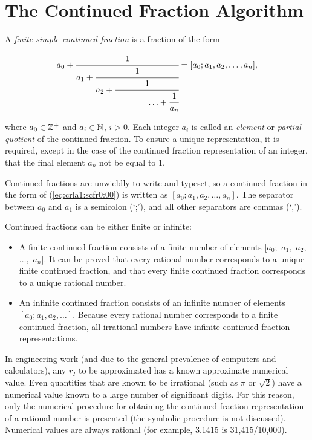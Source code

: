 \section{The Continued Fraction Algorithm}
\label{crla1:scfr0}

A \emph{finite simple continued fraction} is a fraction of the form

\begin{equation}
\label{eq:crla1:scfr0:00}
a_0 + \cfrac{1}{a_1 + \cfrac{1}{a_2
    + \cfrac{1}{\;\;\;\;\;\;\;\;\;\;\;\;\;\;\ldots + \cfrac{1}{a_n}}}}
    =
    [a_0; a_1, a_2, \ldots , a_n] ,
\end{equation}

\noindent{}where $a_0 \in {\mathbb{Z}^+}$ and $a_i \in
{\mathbb{N}}$, $i > 0$.  Each integer $a_i$ is called an
\emph{element} or \emph{partial quotient} of the continued
fraction.  To ensure a unique representation, it is required, except in
the case of the continued fraction representation of an integer, that the
final element $a_n$ not be equal to 1.

Continued fractions are unwieldly to write and typeset, so a continued
fraction in the form of (\ref{eq:crla1:scfr0:00}) is written as
$[a_0; a_1, a_2, \ldots , a_n]$.  The separator between $a_0$ and $a_1$ is
a semicolon (`;'), and all other separators are commas (`,').

Continued fractions can be either finite or infinite:

\begin{itemize}
\item A finite continued fraction consists of a finite number of elements
      $[a_0;$ $a_1,$ $a_2,$ $\ldots ,$ $a_n]$\@.  It can be proved that every rational
      number corresponds to a unique finite continued fraction, and that
      every finite continued fraction corresponds to a unique rational number.
\item An infinite continued fraction consists of an infinite number of
      elements $[a_0; a_1, a_2, \ldots]$.  Because every rational number
      corresponds to a finite continued fraction, all irrational numbers have
      infinite continued fraction representations.
\end{itemize}

In engineering work (and due to the general prevalence of computers
and calculators), any $r_I$ to be approximated has a known approximate
numerical value.  Even quantities that are known to be irrational (such
as $\pi$ or $\sqrt{2}$) have a numerical value known to a large number
of significant digits.  For this reason, only the numerical procedure for
obtaining the continued fraction representation of a rational number is
presented (the symbolic procedure is not discussed).  Numerical values
are always rational (for example, 3.1415 is 31,415/10,000).

